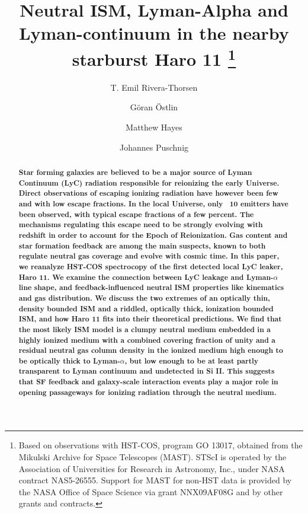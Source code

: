 \documentclass[twocolumn, trackchanges]{aastex61}
\begin{document}
\title{Neutral ISM, Lyman-Alpha and Lyman-continuum in the nearby starburst Haro
11 \footnote{Based on observations with HST-COS, program GO 13017, obtained from
the Mikulski Archive for Space Telescopes (MAST). STScI is operated by the
Association of Universities for Research in Astronomy, Inc., under NASA contract
NAS5-26555. Support for MAST for non-HST data is provided by the NASA Office of
Space Science via grant NNX09AF08G and by other grants and contracts.} }


\author{T. Emil Rivera-Thorsen}
\author{Göran Östlin}
\author{Matthew Hayes}
\author{Johannes Puschnig}


\begin{abstract} \textbf{ Star forming galaxies are believed to be a major
		source of Lyman Continuum (LyC) radiation responsible for
		reionizing the early Universe. Direct observations of escaping
		ionizing radiation have however been few and with low escape
		fractions. In the local Universe, only ~10 emitters have been
		observed, with typical escape fractions of a few percent. The
		mechanisms regulating this escape need to be strongly evolving
		with redshift in order to account for the Epoch of Reionization.
		Gas content and star formation feedback are among the main
		suspects, known to both regulate neutral gas coverage and evolve
		with cosmic time. In this paper, we reanalyze HST-COS
		spectrocopy of the first detected local LyC leaker, Haro 11. We
		examine the connection between LyC leakage and Lyman-$\alpha$
		line shape, and feedback-influenced neutral ISM properties like
		kinematics and gas distribution. We discuss the two extremes of
		an optically thin, density bounded ISM and a riddled, optically
		thick, ionization bounded ISM, and how Haro 11 fits into their
		theoretical predictions.  We find that the most likely ISM model
		is a clumpy neutral medium embedded in a highly ionized medium
		with a combined covering fraction of unity and a residual
		neutral gas column density in the ionized medium high enough to
		be optically thick to Lyman-$\alpha$, but low enough to be at
		least partly transparent to Lyman continuum and undetected in Si
		II. This suggests that SF feedback and galaxy-scale interaction
		events play a major role in opening passageways for ionizing
radiation through the neutral medium.} \end{abstract}
\end{document}
